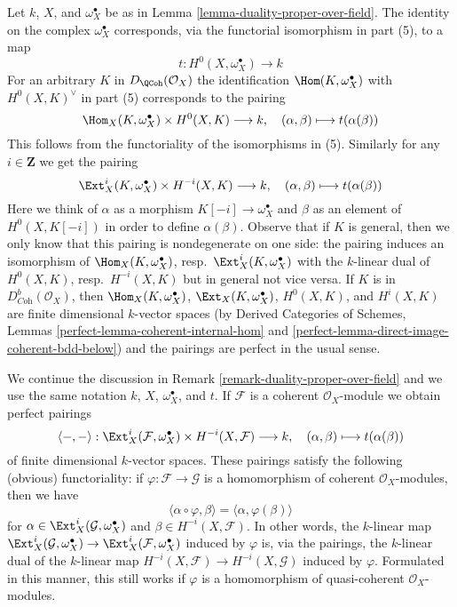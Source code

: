 \begin{remark}
\label{remark-duality-proper-over-field}
Let $k$, $X$, and $\omega_X^\bullet$
be as in Lemma \ref{lemma-duality-proper-over-field}.
The identity on the complex $\omega_X^\bullet$ corresponds, via
the functorial isomorphism in part (5), to a map
$$
t : H^0(X, \omega_X^\bullet) \longrightarrow k
$$
For an arbitrary $K$ in $D_\QCoh(\mathcal{O}_X)$ the identification
$\Hom(K, \omega_X^\bullet)$ with $H^0(X, K)^\vee$ in part (5)
corresponds to the pairing
$$
\Hom_X(K, \omega_X^\bullet) \times H^0(X, K) \longrightarrow k,\quad
(\alpha, \beta) \longmapsto t(\alpha(\beta))
$$
This follows from the functoriality of the isomorphisms in (5). Similarly
for any $i \in \mathbf{Z}$ we get the pairing
$$
\Ext^i_X(K, \omega_X^\bullet) \times H^{-i}(X, K) \longrightarrow k,\quad
(\alpha, \beta) \longmapsto t(\alpha(\beta))
$$
Here we think of $\alpha$ as a morphism $K[-i] \to \omega_X^\bullet$
and $\beta$ as an element of $H^0(X, K[-i])$ in order to define
$\alpha(\beta)$. Observe that if $K$ is general, then we only know
that this pairing is nondegenerate on one side: the pairing induces an
isomorphism of $\Hom_X(K, \omega_X^\bullet)$,
resp.\ $\Ext^i_X(K, \omega_X^\bullet)$ with the $k$-linear dual of $H^0(X, K)$,
resp.\ $H^{-i}(X, K)$ but in general not vice versa. If $K$
is in $D^b_{\textit{Coh}}(\mathcal{O}_X)$, then
$\Hom_X(K, \omega_X^\bullet)$, $\Ext_X(K, \omega_X^\bullet)$,
$H^0(X, K)$, and $H^i(X, K)$ are finite dimensional $k$-vector spaces (by
Derived Categories of Schemes, Lemmas
\ref{perfect-lemma-coherent-internal-hom} and
\ref{perfect-lemma-direct-image-coherent-bdd-below})
and the pairings are perfect in the usual sense.
\end{remark}

\begin{remark}
\label{remark-coherent-duality-proper-over-field}
We continue the discussion in Remark \ref{remark-duality-proper-over-field}
and we use the same notation $k$, $X$, $\omega_X^\bullet$, and $t$.
If $\mathcal{F}$ is a coherent $\mathcal{O}_X$-module we obtain
perfect pairings
$$
\langle -, - \rangle :
\Ext^i_X(\mathcal{F}, \omega_X^\bullet) \times H^{-i}(X,\mathcal{F})
\longrightarrow k,\quad
(\alpha, \beta) \longmapsto t(\alpha(\beta))
$$
of finite dimensional $k$-vector spaces. These pairings satisfy the
following (obvious) functoriality: if $\varphi : \mathcal{F} \to \mathcal{G}$
is a homomorphism of coherent $\mathcal{O}_X$-modules, then we have
$$
\langle \alpha \circ \varphi, \beta \rangle =
\langle \alpha, \varphi(\beta) \rangle
$$
for $\alpha \in \Ext^i_X(\mathcal{G}, \omega_X^\bullet)$ and
$\beta \in H^{-i}(X, \mathcal{F})$. In other words, the $k$-linear map
$\Ext^i_X(\mathcal{G}, \omega_X^\bullet) \to
\Ext^i_X(\mathcal{F}, \omega_X^\bullet)$ induced by $\varphi$
is, via the pairings, the $k$-linear dual of the $k$-linear map
$H^{-i}(X, \mathcal{F}) \to H^{-i}(X, \mathcal{G})$ induced
by $\varphi$. Formulated in this manner, this still works if
$\varphi$ is a homomorphism of quasi-coherent $\mathcal{O}_X$-modules.
\end{remark}

